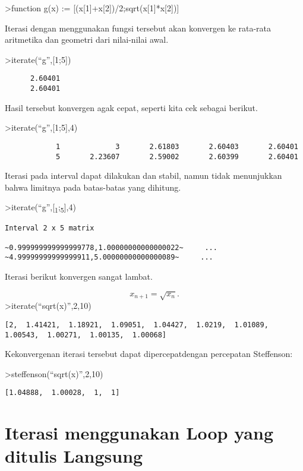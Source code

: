 \documentclass[
]{book}
\begin{document}
\textgreater function g(x) := {[}(x{[}1{]}+x{[}2{]})/2;sqrt(x{[}1{]}*x{[}2{]}){]}

Iterasi dengan menggunakan fungsi tersebut akan konvergen ke rata-rata aritmetika dan geometri dari nilai-nilai awal.

\textgreater iterate(``g'',{[}1;5{]})

\begin{verbatim}
      2.60401 
      2.60401 
\end{verbatim}

Hasil tersebut konvergen agak cepat, seperti kita cek sebagai berikut.

\textgreater iterate(``g'',{[}1;5{]},4)

\begin{verbatim}
            1             3       2.61803       2.60403       2.60401 
            5       2.23607       2.59002       2.60399       2.60401 
\end{verbatim}

Iterasi pada interval dapat dilakukan dan stabil, namun tidak menunjukkan bahwa limitnya pada batas-batas yang dihitung.

\textgreater iterate(``g'',{[}\textsubscript{1};\textsubscript{5}{]},4)

\begin{verbatim}
Interval 2 x 5 matrix

~0.999999999999999778,1.00000000000000022~     ...
~4.99999999999999911,5.00000000000000089~     ...
\end{verbatim}

Iterasi berikut konvergen sangat lambat.

\[x_{n+1} = \sqrt{x_n}.\]\textgreater iterate(``sqrt(x)'',2,10)

\begin{verbatim}
[2,  1.41421,  1.18921,  1.09051,  1.04427,  1.0219,  1.01089,
1.00543,  1.00271,  1.00135,  1.00068]
\end{verbatim}

Kekonvergenan iterasi tersebut dapat dipercepatdengan percepatan Steffenson:

\textgreater steffenson(``sqrt(x)'',2,10)

\begin{verbatim}
[1.04888,  1.00028,  1,  1]
\end{verbatim}

\chapter{Iterasi menggunakan Loop yang ditulis Langsung}\label{iterasi-menggunakan-loop-yang-ditulis-langsung}
\end{document}
